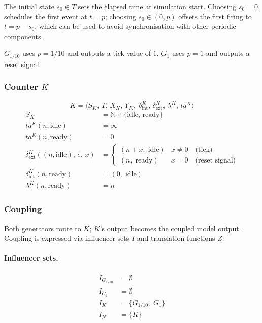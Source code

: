 The initial state $s_0 \in T$ sets the elapsed time at simulation start.
Choosing $s_0 = 0$ schedules the first event at $t = p$; choosing
$s_0 \in (0, p)$ offsets the first firing to $t = p - s_0$, which can be used
to avoid synchronisation with other periodic components.

$G_{1/10}$ uses $p = 1/10$ and outputs a tick value of $1$.
$G_1$ uses $p = 1$ and outputs a reset signal.

\subsubsection*{Counter $K$}

\[
  K = \langle S_K,\, T,\, X_K,\, Y_K,\;
      \delta^K_{\text{int}},\, \delta^K_{\text{ext}},\,
      \lambda^K,\, ta^K \rangle
\]
\begin{align*}
  S_K &= \mathbb{N} \times \{\text{idle},\, \text{ready}\} \\
  ta^K(n, \text{idle})  &= \infty \\
  ta^K(n, \text{ready}) &= 0 \\
  \delta^K_{\text{ext}}\!\left((n,\text{idle}),\, e,\, x\right)
    &= \begin{cases}
         (n + x,\; \text{idle})  & x \neq 0 \quad\text{(tick)}\\
         (n,\;     \text{ready}) & x = 0    \quad\text{(reset signal)}
       \end{cases}\\
  \delta^K_{\text{int}}(n, \text{ready}) &= (0,\; \text{idle}) \\
  \lambda^K(n, \text{ready}) &= n
\end{align*}

\subsubsection*{Coupling}

Both generators route to $K$; $K$'s output becomes the coupled model output.
Coupling is expressed via influencer sets $I$ and translation functions $Z$:

\paragraph{Influencer sets.}
\begin{align*}
  I_{G_{1/10}} &= \emptyset \\
  I_{G_1}      &= \emptyset \\
  I_K          &= \{G_{1/10},\; G_1\} \\
  I_N          &= \{K\}
\end{align*}

